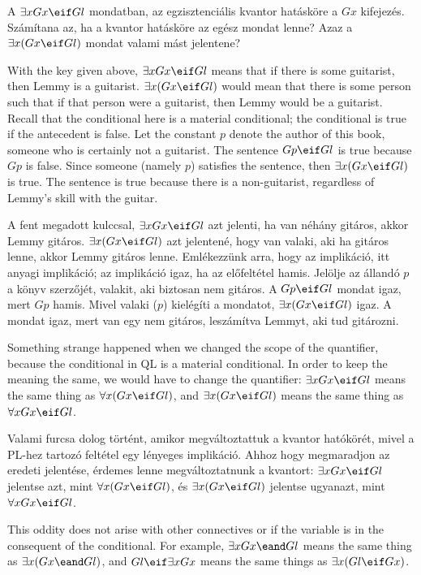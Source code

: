 A $\exists x Gx \eif Gl$ mondatban, az egzisztenciális kvantor hatásköre a $Gx$ kifejezés. Számítana az, ha a kvantor hatásköre az egész mondat lenne? Azaz a $\exists x (Gx \eif Gl)$ mondat valami mást jelentene?


With the key given above, $\exists x Gx \eif Gl$ means that if there is some guitarist, then Lemmy is a guitarist. $\exists x (Gx \eif Gl)$ would mean that there is some person such that if that person were a guitarist, then Lemmy would be a guitarist. Recall that the conditional here is a material conditional; the conditional is true if the antecedent is false. Let the constant $p$ denote the author of this book, someone who is certainly not a guitarist. The sentence $Gp \eif Gl$ is true because $Gp$ is false. Since someone (namely $p$) satisfies the sentence, then $\exists x (Gx \eif Gl)$ is true. The sentence is true because there is a non-guitarist, regardless of Lemmy's skill with the guitar.

A fent megadott kulccsal, $\exists x Gx \eif Gl$ azt jelenti, ha van néhány gitáros, akkor Lemmy gitáros. $\exists x (Gx \eif Gl)$ azt jelentené, hogy van valaki, aki ha gitáros lenne, akkor Lemmy gitáros lenne. Emlékezzünk arra, hogy az implikáció, itt anyagi implikáció; az implikáció igaz, ha az előfeltétel hamis. Jelölje az állandó $p$ a könyv szerzőjét, valakit, aki biztosan nem gitáros. A $Gp \eif Gl$ mondat igaz, mert $Gp$ hamis. Mivel valaki ($p$) kielégíti a mondatot, $\exists x (Gx \eif Gl)$ igaz. A mondat igaz, mert van egy nem gitáros, leszámítva Lemmyt, aki tud gitározni.





Something strange happened when we changed the scope of the quantifier, because the conditional in QL is a material conditional. In order to keep the meaning the same, we would have to change the quantifier: $\exists x Gx \eif Gl$ means the same thing as $\forall x (Gx \eif Gl)$, and $\exists x (Gx \eif Gl)$ means the same thing as $\forall x Gx \eif Gl$.

Valami furcsa dolog történt, amikor megváltoztattuk a kvantor hatókörét, mivel a PL-hez tartozó feltétel egy lényeges implikáció. Ahhoz hogy megmaradjon az eredeti jelentése, érdemes lenne megváltoztatnunk a kvantort: $\exists x Gx \eif Gl$ jelentse azt, mint $\forall x (Gx \eif Gl)$, és $\exists x (Gx \eif Gl)$ jelentse ugyanazt, mint $\forall x Gx \eif Gl$.

This oddity does not arise with other connectives or if the variable is in the consequent of the conditional. For example, $\exists x Gx \eand Gl$ means the same thing as $\exists x (Gx \eand Gl)$, and $Gl \eif \exists x Gx$ means the same things as $\exists x(Gl \eif Gx)$.

